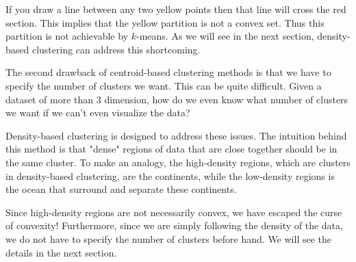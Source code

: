 If you draw a line between any two yellow points then that line will
cross the red section. This implies that the yellow partition is not a convex
set. Thus this partition is not achievable by $k$-means. As we will see
in the next section, density-based clustering can address this shortcoming.

The second drawback of centroid-based clustering methods is that we have
to specify the number of clusters we want. This can be quite difficult. Given
a dataset of more than 3 dimension, how do we even know what number of clusters
we want if we can't even visualize the data?

Density-based clustering is designed to address these issues.
The intuition behind this method is that "dense" regions of data
that are close together should be in the same cluster. To make an analogy,
the high-density regions, which are clusters in density-based clustering, are the continents,
while the low-density regions is the ocean that surround and separate these
continents.

Since high-density regions are not necessarily convex, we have escaped the curse of
convexity! Furthermore, since we are simply following the density of the data,
we do not have to specify the number of clusters before hand. We will see the
details in the next section.
